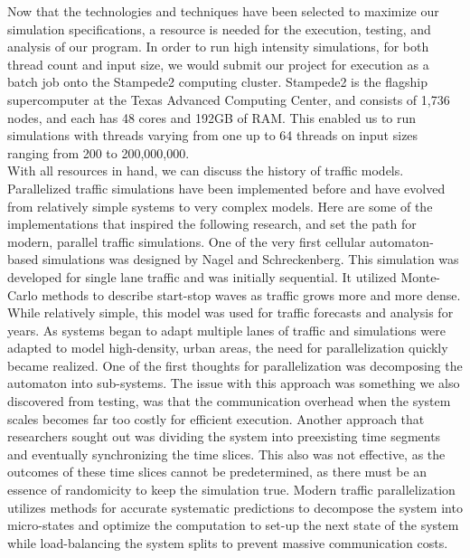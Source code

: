 \documentclass[conference]{IEEEtran}
\begin{document}
Now that the technologies and techniques have been selected to maximize our simulation specifications, a resource is needed for the execution, testing, and analysis of our program. In order to run high intensity simulations, for both thread count and input size, we would submit our project for execution as a batch job onto the Stampede2 computing cluster. Stampede2 is the flagship supercomputer at the Texas Advanced Computing Center, and consists of 1,736 nodes, and each has 48 cores and 192GB of RAM. This enabled us to run simulations with threads varying from one up to 64 threads on input sizes ranging from 200 to 200,000,000. \cite{stampede2} \\

With all resources in hand, we can discuss the history of traffic models. Parallelized traffic simulations have been implemented before and have evolved from relatively simple systems to very complex models.  Here are some of the implementations that inspired the following research, and set the path for modern, parallel traffic simulations. One of the very first cellular automaton-based simulations was designed by Nagel and Schreckenberg.  This simulation was developed for single lane traffic and was initially sequential.  It utilized Monte-Carlo methods to describe start-stop waves as traffic grows more and more dense.  While relatively simple, this model was used for traffic forecasts and analysis for years. As systems began to adapt multiple lanes of traffic and simulations were adapted to model high-density, urban areas, the need for parallelization quickly became realized. One of the first thoughts for parallelization was decomposing the automaton into sub-systems. The issue with this approach was something we also discovered from testing, was that the communication overhead when the system scales becomes far too costly for efficient execution.  Another approach that researchers sought out was dividing the system into preexisting time segments and eventually synchronizing the time slices. This also was not effective, as the outcomes of these time slices cannot be predetermined, as there must be an essence of randomicity to keep the simulation true.  Modern traffic parallelization utilizes methods for accurate systematic predictions to decompose the system into micro-states and optimize the computation to set-up the next state of the system while load-balancing the system splits to prevent massive communication costs. \cite{1443306} \\
\end{document}
